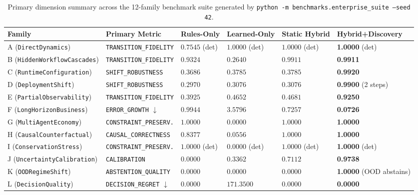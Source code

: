 \documentclass[11pt,a4paper]{article}
\begin{document}
\begin{table}[h]
\centering
\small
\begin{tabular}{llllll}
\toprule
\textbf{Family} & \textbf{Primary Metric} & \textbf{Rules-Only} & \textbf{Learned-Only} & \textbf{Static Hybrid} & \textbf{Hybrid+Discovery} \\
\midrule
A (\texttt{DirectDynamics}) & \texttt{TRANSITION\_FIDELITY} & $0.7545$ (det) & $1.0000$ (det) & $1.0000$ (det) & \textbf{1.0000} (det) \\
B (\texttt{HiddenWorkflowCascades}) & \texttt{TRANSITION\_FIDELITY} & $0.9324$ & $0.2640$ & $0.9911$ & \textbf{0.9911} \\
C (\texttt{RuntimeConfiguration}) & \texttt{SHIFT\_ROBUSTNESS} & $0.3686$ & $0.3785$ & $0.3785$ & \textbf{0.9920} \\
D (\texttt{DeploymentShift}) & \texttt{SHIFT\_ROBUSTNESS} & $0.2970$ & $0.3076$ & $0.3076$ & \textbf{0.9900} (2 steps) \\
E (\texttt{PartialObservability}) & \texttt{TRANSITION\_FIDELITY} & $0.3925$ & $0.4652$ & $0.4681$ & \textbf{0.9250} \\
F (\texttt{LongHorizonBusiness}) & \texttt{ERROR\_GROWTH} $\downarrow$ & $0.9944$ & $3.5796$ & $0.7257$ & \textbf{0.0726} \\
G (\texttt{MultiAgentEconomy}) & \texttt{CONSTRAINT\_PRESERV.} & $1.0000$ & $0.0000$ & $1.0000$ & \textbf{1.0000} \\
H (\texttt{CausalCounterfactual}) & \texttt{CAUSAL\_CORRECTNESS} & $0.8377$ & $0.0556$ & $1.0000$ & \textbf{1.0000} \\
I (\texttt{ConservationStress}) & \texttt{CONSTRAINT\_PRESERV.} & $1.0000$ (det) & $0.0000$ (det) & $1.0000$ (det) & \textbf{1.0000} (det) \\
J (\texttt{UncertaintyCalibration}) & \texttt{CALIBRATION} & $0.0000$ & $0.3362$ & $0.7112$ & \textbf{0.9738} \\
K (\texttt{OODRegimeShift}) & \texttt{ABSTENTION\_QUALITY} & $0.0000$ & $0.0000$ & $0.0000$ & \textbf{1.0000} (OOD abstains) \\
L (\texttt{DecisionQuality}) & \texttt{DECISION\_REGRET} $\downarrow$ & $0.0000$ & $171.3500$ & $0.0000$ & \textbf{0.0000} \\
\bottomrule
\end{tabular}
\caption{Primary dimension summary across the 12-family benchmark suite generated by \texttt{python -m benchmarks.enterprise\_suite --seed 42}.}
\label{tab:suite}
\end{table}
\end{document}
